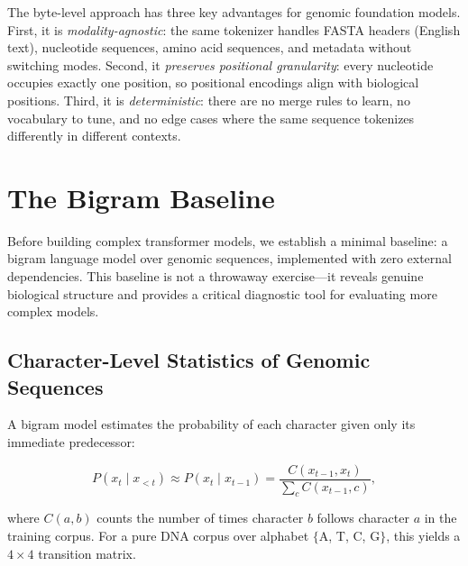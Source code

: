 The byte-level approach has three key advantages for genomic foundation models. First, it is \emph{modality-agnostic}: the same tokenizer handles FASTA headers (English text), nucleotide sequences, amino acid sequences, and metadata without switching modes. Second, it \emph{preserves positional granularity}: every nucleotide occupies exactly one position, so positional encodings align with biological positions. Third, it is \emph{deterministic}: there are no merge rules to learn, no vocabulary to tune, and no edge cases where the same sequence tokenizes differently in different contexts.

\section{The Bigram Baseline}
\label{sec:bigram-baseline}

Before building complex transformer models, we establish a minimal baseline: a bigram language model over genomic sequences, implemented with zero external dependencies. This baseline is not a throwaway exercise---it reveals genuine biological structure and provides a critical diagnostic tool for evaluating more complex models.

\subsection{Character-Level Statistics of Genomic Sequences}

A bigram model estimates the probability of each character given only its immediate predecessor:

\begin{equation}
P(x_t \mid x_{<t}) \approx P(x_t \mid x_{t-1}) = \frac{C(x_{t-1}, x_t)}{\sum_{c} C(x_{t-1}, c)},
\label{eq:bigram}
\end{equation}

where $C(a, b)$ counts the number of times character $b$ follows character $a$ in the training corpus. For a pure DNA corpus over alphabet $\{$A, T, C, G$\}$, this yields a $4 \times 4$ transition matrix.


